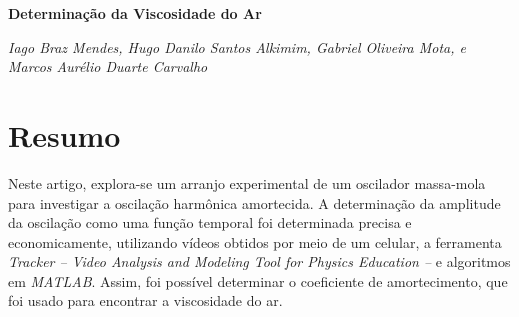 \documentclass[a4paper, 12pt]{article}
\begin{document}
	\begin{center}
	\begin{large}
		\textbf{Determinação da Viscosidade do Ar}	
	\end{large}
	\end{center}
	
	\begin{center}
		\textit{Iago Braz Mendes, Hugo Danilo Santos Alkimim, Gabriel Oliveira Mota, e Marcos Aurélio Duarte Carvalho}
	\end{center}

	\section*{Resumo}
		Neste artigo, explora-se um arranjo experimental de um oscilador massa-mola para investigar a oscilação harmônica amortecida. A determinação da amplitude da oscilação como uma função temporal foi determinada precisa e economicamente, utilizando vídeos obtidos por meio de um celular, a ferramenta \textit{Tracker -- Video Analysis and Modeling Tool for Physics Education --} e algoritmos em \textit{MATLAB}. Assim, foi possível determinar o coeficiente de amortecimento, que foi usado para encontrar a viscosidade do ar.
\end{document}
